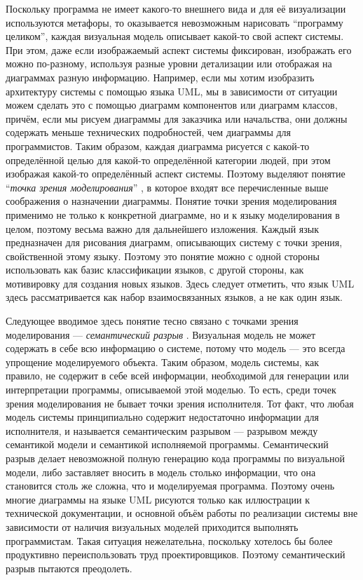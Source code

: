 Поскольку программа не имеет какого-то внешнего вида и для её визуализации 
используются метафоры, то оказывается невозможным нарисовать 
"`программу целиком"', каждая визуальная модель описывает какой-то свой аспект 
системы. При этом, даже если изображаемый аспект системы фиксирован, изображать 
его можно по-разному, используя разные уровни детализации или отображая на 
диаграммах разную информацию. Например, если мы хотим изобразить архитектуру 
системы с помощью языка UML, мы в зависимости от ситуации можем сделать это с 
помощью диаграмм компонентов или диаграмм классов, причём, если мы рисуем 
диаграммы для заказчика или начальства, они должны содержать меньше технических 
подробностей, чем диаграммы для программистов. Таким образом, каждая диаграмма 
рисуется с какой-то определённой целью для какой-то определённой категории 
людей, при этом изображая какой-то определённый аспект системы. Поэтому выделяют 
понятие "`\textit{точка зрения моделирования}"'
, в которое входят все перечисленные выше 
соображения о назначении диаграммы. Понятие точки зрения моделирования применимо 
не только к конкретной диаграмме, но и к языку моделирования в целом, поэтому 
весьма важно для дальнейшего изложения. Каждый язык предназначен для рисования 
диаграмм, описывающих систему с точки зрения, свойственной этому языку. 
Поэтому это понятие можно с одной стороны использовать как базис классификации 
языков, с другой стороны, как мотивировку для создания новых языков. Здесь 
следует отметить, что язык UML здесь рассматривается как набор взаимосвязанных 
языков, а не как один язык.

Следующее вводимое здесь понятие тесно связано с точками зрения моделирования 
--- \textit{семантический разрыв}
. Визуальная модель не может содержать в себе всю 
информацию о системе, потому что модель --- это всегда упрощение моделируемого 
объекта. Таким образом, модель системы, как правило, не содержит в себе всей 
информации, необходимой для генерации или интерпретации программы, описываемой 
этой моделью. То есть, среди точек зрения моделирования не бывает точки зрения 
исполнителя. Тот факт, что любая модель системы принципиально содержит 
недостаточно информации для исполнителя, и называется семантическим разрывом ---
разрывом между семантикой модели и семантикой исполняемой программы. 
Семантический разрыв делает невозможной полную генерацию кода программы по 
визуальной модели, либо заставляет вносить в модель столько информации, что 
она становится столь же сложна, что и моделируемая программа. Поэтому очень 
многие диаграммы на языке UML рисуются только как иллюстрации к технической 
документации, и основной объём работы по реализации системы вне зависимости от 
наличия визуальных моделей приходится выполнять программистам. Такая ситуация 
нежелательна, поскольку хотелось бы более продуктивно переиспользовать труд 
проектировщиков. Поэтому семантический разрыв пытаются преодолеть.

